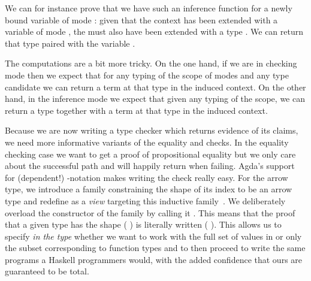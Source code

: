 \begin{agdasnippet}
\end{agdasnippet}

We can for instance prove that we have such an inference function for a newly bound
variable of mode : given that the context has been extended with a variable
of mode , the  must also have been extended with a type .
We can return that type paired with the variable .

\begin{agdasnippet}
\end{agdasnippet}

The computations are a bit more tricky. On the one hand, if we are in checking mode
then we expect that for any typing of the scope of modes and any type candidate we
can  return a term at that type in the induced context. On the other hand,
in the inference mode we expect that given any typing of the scope, we can 
return a type together with a term at that type in the induced context.

\begin{agdasnippet}
\end{agdasnippet}

Because we are now writing a type checker which returns evidence of its claims, we need
more informative variants of the equality and  checks. In the equality
checking case we want to get a proof of propositional equality but we only care
about the successful path and will happily return  when failing.
Agda's support for (dependent!) -notation makes writing the check
really easy. For the arrow type, we introduce a family  constraining the
shape of its index to be an arrow type and redefine  as a \emph{view} targeting
this inductive family~\cite{DBLP:conf/popl/Wadler87,DBLP:journals/jfp/McBrideM04}.
We deliberately overload the constructor of the  family by calling
it . This means that the proof that a given type has the shape
{(  )} is literally written {(  )}.
This allows us to specify \emph{in the type} whether we want to work with the
full set of values in  or only the subset corresponding to function
types and to then proceed to write the same programs a Haskell programmers would,
with the added confidence that ours are guaranteed to be total.

